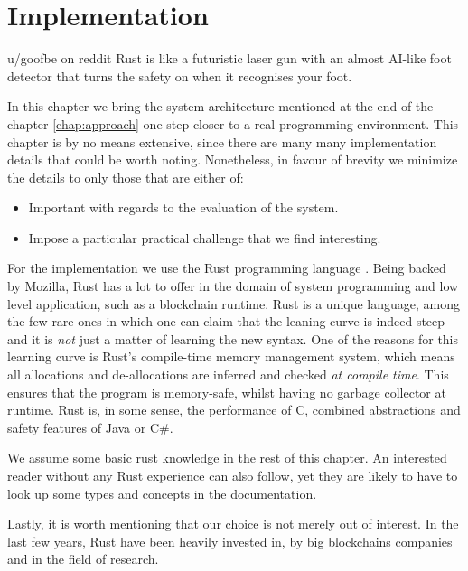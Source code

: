 \chapter{Implementation} \label{chap:impl}

\begin{chapquote}{u/goofbe on reddit}
	Rust is like a futuristic laser gun with an almost AI-like foot detector that turns the safety
	on when it recognises your foot.
\end{chapquote}

In this chapter we bring the system architecture mentioned at the end of the chapter
\ref{chap:approach} one step closer to a real programming environment. This chapter is by no means
extensive, since there are many many implementation details that could be worth noting. Nonetheless,
in favour of brevity we minimize the details to only those that are either of:

\begin{itemize}
	\item Important with regards to the evaluation of the system.
	\item Impose a particular practical challenge that we find interesting.
\end{itemize}

For the implementation we use the Rust programming language
\cite{klabnikRustProgrammingLanguage2019}. Being backed by Mozilla, Rust has a lot to offer in the
domain of system programming and low level application, such as a blockchain runtime. Rust is a
unique language, among the few rare ones in which one can claim that the leaning curve is indeed
steep and it is \textit{not} just a matter of learning the new syntax. One of the reasons for this
learning curve is Rust's compile-time memory management system, which means all allocations and
de-allocations are inferred and checked \textit{at compile time}. This ensures that the program is
memory-safe, whilst having no garbage collector at runtime. Rust is, in some sense, the performance
of C, combined abstractions and safety features of Java or
C\#\cite{jungRustBeltSecuringFoundations2017}.

\begin{remark}
	We assume some basic rust knowledge in the rest of this chapter. An interested reader without
	any Rust experience can also follow, yet they are likely to have to look up some types and
	concepts in the documentation.
\end{remark}

Lastly, it is worth mentioning that our choice is not merely out of interest. In the last few years,
Rust have been heavily invested in, by big blockchains companies and in the field of
research\cite{RustBlockchain}.

